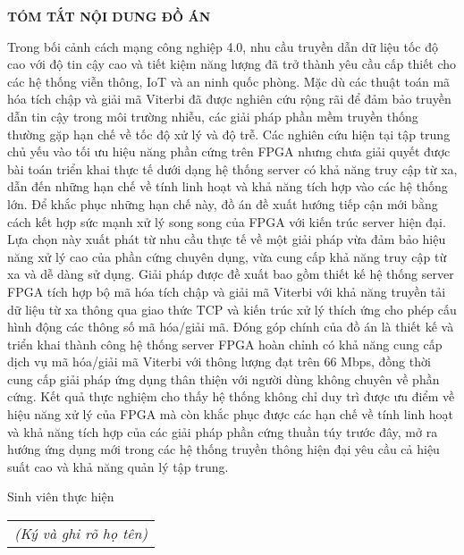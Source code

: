 \documentclass[../DoAn.tex]{subfiles}
\begin{document}
\begin{center}
    \Large{\textbf{TÓM TẮT NỘI DUNG ĐỒ ÁN}}\\
\end{center}
\vspace{1cm}
Trong bối cảnh cách mạng công nghiệp 4.0, nhu cầu truyền dẫn dữ liệu tốc độ cao với độ tin cậy cao và tiết kiệm năng lượng đã trở thành yêu cầu cấp thiết cho các hệ thống viễn thông, IoT và an ninh quốc phòng. Mặc dù các thuật toán mã hóa tích chập và giải mã Viterbi đã được nghiên cứu rộng rãi để đảm bảo truyền dẫn tin cậy trong môi trường nhiễu, các giải pháp phần mềm truyền thống thường gặp hạn chế về tốc độ xử lý và độ trễ. Các nghiên cứu hiện tại tập trung chủ yếu vào tối ưu hiệu năng phần cứng trên FPGA nhưng chưa giải quyết được bài toán triển khai thực tế dưới dạng hệ thống server có khả năng truy cập từ xa, dẫn đến những hạn chế về tính linh hoạt và khả năng tích hợp vào các hệ thống lớn. Để khắc phục những hạn chế này, đồ án đề xuất hướng tiếp cận mới bằng cách kết hợp sức mạnh xử lý song song của FPGA với kiến trúc server hiện đại. Lựa chọn này xuất phát từ nhu cầu thực tế về một giải pháp vừa đảm bảo hiệu năng xử lý cao của phần cứng chuyên dụng, vừa cung cấp khả năng truy cập từ xa và dễ dàng sử dụng. Giải pháp được đề xuất bao gồm thiết kế hệ thống server FPGA tích hợp bộ mã hóa tích chập và giải mã Viterbi với khả năng truyền tải dữ liệu từ xa thông qua giao thức TCP và kiến trúc xử lý thích ứng cho phép cấu hình động các thông số mã hóa/giải mã. Đóng góp chính của đồ án là thiết kế và triển khai thành công hệ thống server FPGA hoàn chỉnh có khả năng cung cấp dịch vụ mã hóa/giải mã Viterbi với thông lượng đạt trên 66 Mbps, đồng thời cung cấp giải pháp ứng dụng thân thiện với người dùng không chuyên về phần cứng. Kết quả thực nghiệm cho thấy hệ thống không chỉ duy trì được ưu điểm về hiệu năng xử lý của FPGA mà còn khắc phục được các hạn chế về tính linh hoạt và khả năng tích hợp của các giải pháp phần cứng thuần túy trước đây, mở ra hướng ứng dụng mới trong các hệ thống truyền thông hiện đại yêu cầu cả hiệu suất cao và khả năng quản lý tập trung.

\begin{flushright}
Sinh viên thực hiện\\
\begin{tabular}{@{}c@{}}
\textit{(Ký và ghi rõ họ tên)}
\end{tabular}
\end{flushright}
\end{document}
